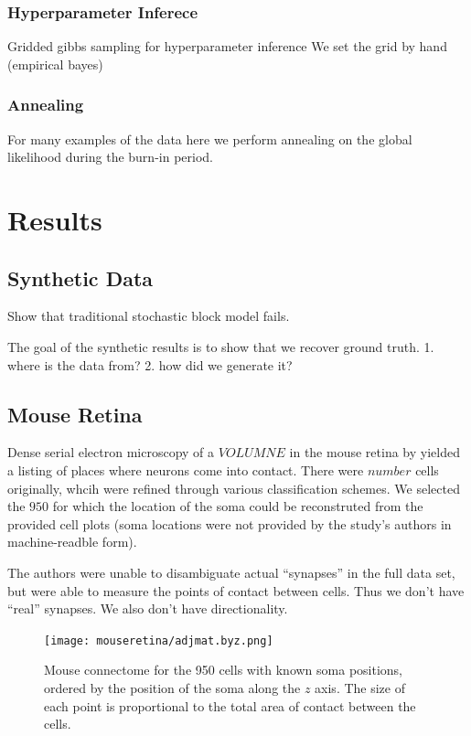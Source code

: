 \documentclass{article}
\begin{document}
\subsubsection{Hyperparameter Inferece}
Gridded gibbs sampling for hyperparameter inference
We set the grid by hand (empirical bayes)


\subsubsection{Annealing}
For many examples of the data here we perform annealing on the global likelihood during the burn-in period.  


\section{Results}

\subsection{Synthetic Data}
Show that traditional stochastic block model fails. 


The goal of the synthetic results is to show that we recover ground truth. 
1. where is the data from? 
2. how did we generate it? 


\subsection{Mouse Retina}

Dense serial electron microscopy of a $VOLUMNE$ in the mouse
retina by \autocite{Helmstaedter2013} yielded a listing of places where
neurons come into contact. There were $number$ cells originally, whcih
were refined through various classification schemes. We selected the
$950$ for which the location of the soma could be reconstruted from
the provided cell plots (soma locations were not provided by the
study's authors in machine-readble form).

The authors were unable to disambiguate actual ``synapses'' in the
full data set, but were able to measure the points of contact between
cells. Thus we don't have ``real'' synapses. We also don't have directionality. 

\begin{figure}
  \centering 
  \texttt{[image: mouseretina/adjmat.byz.png]}
  \caption{Mouse connectome for the 950 cells with known soma positions, ordered by the position of the soma along the $z$ axis. The size of each point is proportional to the total area of contact between the cells.}
  \label{fig:mouseretina:adj}
\end{figure}
\end{document}
